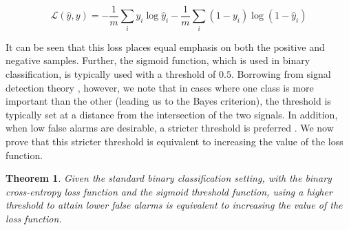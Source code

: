 \documentclass[10pt,compsoc,twocolumn]{IEEEtran}
\begin{document}
\[
    \mathcal{L}(\hat{y}, y) = -\frac{1}{m} \sum\limits_i y_i \log \hat{y}_i -\frac{1}{m} \sum\limits_i (1-y_i)\log (1-\hat{y}_i)
\]

It can be seen that this loss places equal emphasis on both the positive and negative samples. Further, the sigmoid function, which is used in binary classification, is typically used with a threshold of $0.5$. Borrowing from signal detection theory \cite{green1966signal}, however, we note that in cases where one class is more important than the other (leading us to the Bayes criterion), the threshold is typically set at a distance from the intersection of the two signals. In addition, when low false alarms are desirable, a stricter threshold is preferred \cite{koenig2011absolute}. We now prove that this stricter threshold is equivalent to increasing the value of the loss function.

\newtheorem{theorem}{Theorem}
\begin{theorem}
Given the standard binary classification setting, with the binary cross-entropy loss function and the sigmoid threshold function, using a higher threshold to attain lower false alarms is equivalent to increasing the value of the loss function.
\end{theorem}
\end{document}
